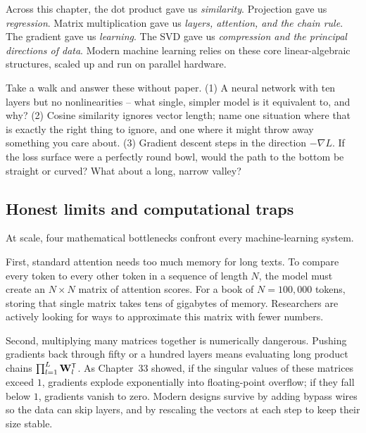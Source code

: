 \begin{aestheticbox}
Across this chapter, the dot product gave us \emph{similarity}. Projection gave us
\emph{regression}. Matrix multiplication gave us \emph{layers, attention, and the chain
rule}. The gradient gave us \emph{learning}. The SVD gave us \emph{compression and the
principal directions of data}. Modern machine learning relies on these core linear-algebraic structures, scaled up and run on parallel hardware.
\end{aestheticbox}

\begin{walkbox}
Take a walk and answer these without paper. (1) A neural network with ten layers but no
nonlinearities -- what single, simpler model is it equivalent to, and why?
(2) Cosine similarity ignores vector length; name one situation where that is exactly the
right thing to ignore, and one where it might throw away something you care about.
(3) Gradient descent steps in the direction $-\nabla L$. If the loss surface were a
perfectly round bowl, would the path to the bottom be straight or curved? What about a
long, narrow valley?
\end{walkbox}

\subsection*{Honest limits and computational traps}

At scale, four mathematical bottlenecks confront every machine-learning system.

First, standard attention needs too much memory for long texts. To compare
every token to every other token in a sequence of length $N$, the model must create
an $N \times N$ matrix of attention scores. For a book of $N = 100{,}000$ tokens,
storing that single matrix takes tens of gigabytes of memory. Researchers are actively
looking for ways to approximate this matrix with fewer numbers.

Second, multiplying many matrices together is numerically dangerous. Pushing gradients back
through fifty or a hundred layers means evaluating long product chains $\prod_{l=1}^L
\mathbf{W}_l^{\mathsf{T}}$. As Chapter~33 showed, if the singular values of these matrices
exceed $1$, gradients explode exponentially into floating-point overflow;
if they fall below $1$, gradients vanish to zero. Modern designs
survive by adding bypass wires so the data can skip layers, and by rescaling the
vectors at each step to keep their size stable.

